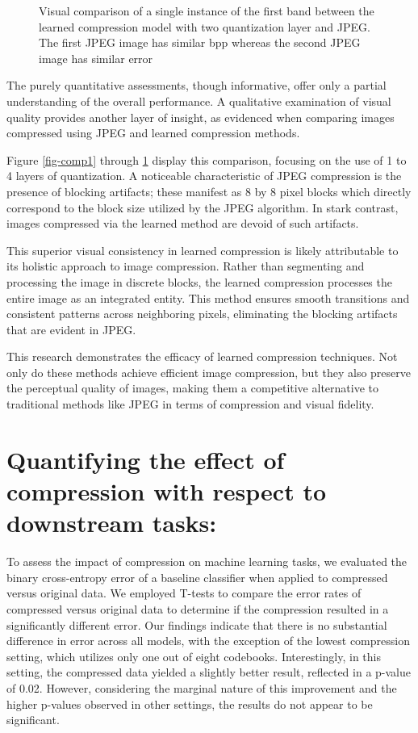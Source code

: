 \documentclass[runningheads]{llncs}
\begin{document}
\begin{figure}
\begin{tabular}{ccc}
\end{tabular}
\caption{Visual comparison of a single instance of the first band between the learned compression model with two 
quantization layer and JPEG. The first JPEG image has similar bpp whereas the second JPEG image has similar error}
\label{fig-comp4}
\end{figure}

The purely quantitative assessments, though informative, offer only a partial understanding of the 
overall performance. A qualitative examination of visual quality provides another layer of insight, as 
evidenced when comparing images compressed using JPEG and learned compression methods. 

Figure \ref{fig-comp1} through \ref{fig-comp4} display this comparison, focusing on the use of 1 to 4 layers of quantization. A 
noticeable characteristic of JPEG compression is the presence of blocking artifacts; these manifest as 
8 by 8 pixel blocks which directly correspond to the block size utilized by the JPEG algorithm. In stark 
contrast, images compressed via the learned method are devoid of such artifacts. 
 
This superior visual consistency in learned compression is likely attributable to its holistic approach to 
image compression. Rather than segmenting and processing the image in discrete blocks, the learned 
compression processes the entire image as an integrated entity. This method ensures smooth 
transitions and consistent patterns across neighboring pixels, eliminating the blocking artifacts that 
are evident in JPEG. 
 
This research demonstrates the efficacy of learned compression techniques. Not only do these 
methods achieve efficient image compression, but they also preserve the perceptual quality of 
images, making them a competitive alternative to traditional methods like JPEG in terms of 
compression and visual fidelity.

\section{Quantifying the effect of compression with respect to downstream tasks:} 

To assess the impact of compression on machine learning tasks, we evaluated the binary cross-entropy 
error of a baseline classifier when applied to compressed versus original data. We employed T-tests 
to compare the error rates of compressed versus original data to determine if the compression 
resulted in a significantly different error. Our findings indicate that there is no substantial difference 
in error across all models, with the exception of the lowest compression setting, which utilizes only 
one out of eight codebooks. Interestingly, in this setting, the compressed data yielded a slightly better 
result, reflected in a p-value of 0.02. However, considering the marginal nature of this improvement 
and the higher p-values observed in other settings, the results do not appear to be significant. 
 
\end{document}
